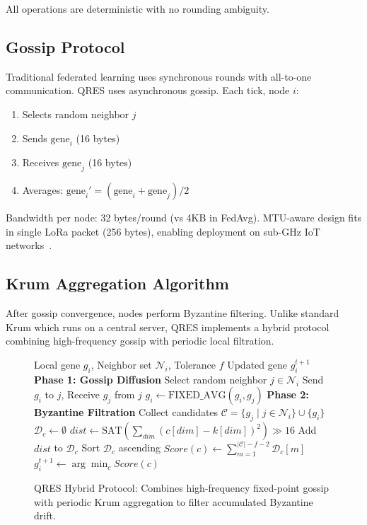 \documentclass[conference,10pt]{IEEEtran}
\begin{document}
All operations are deterministic with no rounding ambiguity.

\subsection{Gossip Protocol}
Traditional federated learning uses synchronous rounds with all-to-one communication. QRES uses asynchronous gossip. Each tick, node $i$:
\begin{enumerate}
    \item Selects random neighbor $j$
    \item Sends $\text{gene}_i$ (16 bytes)
    \item Receives $\text{gene}_j$ (16 bytes)
    \item Averages: $\text{gene}_i' = (\text{gene}_i + \text{gene}_j) / 2$
\end{enumerate}

Bandwidth per node: 32 bytes/round (vs 4KB in FedAvg). MTU-aware design fits in single LoRa packet (256 bytes), enabling deployment on sub-GHz IoT networks~\cite{adelantado2017understanding}.

\subsection{Krum Aggregation Algorithm}
After gossip convergence, nodes perform Byzantine filtering. Unlike standard Krum which runs on a central server, QRES implements a hybrid protocol combining high-frequency gossip with periodic local filtration.

\begin{figure}[t]
\renewcommand{\algorithmicrequire}{\textbf{Input:}}
\renewcommand{\algorithmicensure}{\textbf{Output:}}
\begin{algorithmic}[1]
\REQUIRE Local gene $g_i$, Neighbor set $\mathcal{N}_i$, Tolerance $f$
\ENSURE Updated gene $g_i^{t+1}$
\STATE \textbf{Phase 1: Gossip Diffusion}
    \STATE Select random neighbor $j \in \mathcal{N}_i$
    \STATE Send $g_i$ to $j$, Receive $g_j$ from $j$
    \STATE $g_i \leftarrow \text{FIXED\_AVG}(g_i, g_j)$ 
\ENDFOR
\STATE \textbf{Phase 2: Byzantine Filtration}
\STATE Collect candidates $\mathcal{C} = \{g_j \mid j \in \mathcal{N}_i\} \cup \{g_i\}$
    \STATE $\mathcal{D}_c \leftarrow \emptyset$
        \STATE $dist \leftarrow \text{SAT}\left(\sum_{dim} (c[dim] - k[dim])^2\right) \gg 16$ 
        \STATE Add $dist$ to $\mathcal{D}_c$
    \ENDFOR
    \STATE Sort $\mathcal{D}_c$ ascending
    \STATE $Score(c) \leftarrow \sum_{m=1}^{|\mathcal{C}|-f-2} \mathcal{D}_c[m]$
\ENDFOR
\STATE $g_i^{t+1} \leftarrow \arg\min_{c} Score(c)$
\end{algorithmic}
\caption{QRES Hybrid Protocol: Combines high-frequency fixed-point gossip with periodic Krum aggregation to filter accumulated Byzantine drift.}
\label{alg:qres_full}
\end{figure}
\end{document}
